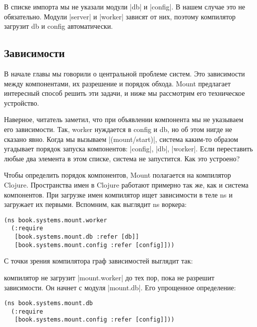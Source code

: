В списке импорта мы не указали модули \spverb|db| и \spverb|config|. В нашем случае это не
обязательно. Модули \spverb|server| и \spverb|worker| зависят от них, поэтому компилятор
загрузит db и config автоматически.

\subsection{Зависимости}

В начале главы мы говорили о центральной проблеме систем. Это зависимости между
компонентами, их разрешение и порядок обхода. Mount предлагает интересный способ
решить эти задачи, и ниже мы рассмотрим его техническое устройство.

Наверное, читатель заметил, что при объявлении компонента мы не указываем его
зависимости. Так, worker нуждается в config и db, но об этом нигде не сказано
явно. Когда мы вызываем \spverb|(mount/start)|, система каким-то образом угадывает
порядок запуска компонентов: \spverb|config|, \spverb|db|, \spverb|worker|. Если переставить любые
два элемента в этом списке, система не запустится. Как это устроено?

Чтобы определить порядок компонентов, Mount полагается на компилятор
Clojure. Пространства имен в Clojure работают примерно так же, как и система
компонентов. При загрузке имен компилятор ищет зависимости в теле ns и загружает
их первыми. Вспомним, как выглядит ns воркера:

\begin{verbatim}
(ns book.systems.mount.worker
  (:require
   [book.systems.mount.db :refer [db]]
   [book.systems.mount.config :refer [config]]))
\end{verbatim}

С точки зрения компилятора граф зависимостей выглядит так:


компилятор не загрузит \spverb|mount.worker| до тех пор, пока не разрешит
зависимости. Он начнет с модуля \spverb|mount.db|. Его упрощенное определение:

\begin{verbatim}
(ns book.systems.mount.db
  (:require
   [book.systems.mount.config :refer [config]]))
\end{verbatim}

